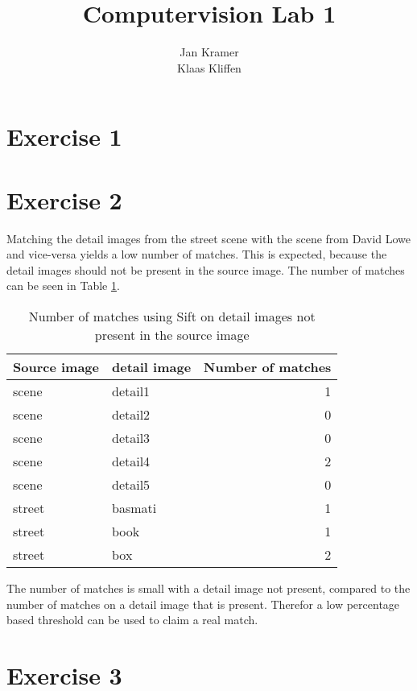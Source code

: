 \documentclass[11pt,a4paper]{article}
\author{Jan Kramer\\Klaas Kliffen}
\title{Computervision Lab 1}
\begin{document}
\maketitle

\section*{Exercise 1}

\section*{Exercise 2}
Matching the detail images from the street scene with the scene from David Lowe and vice-versa yields a low number of matches.
This is expected, because the detail images should not be present in the source image. The number of matches can be seen in Table \ref{tab:mismatches}.
\begin{table}[H]
\centering
\begin{tabular}{l|l|r}
Source image & detail image & Number of matches\\
\hline
scene & detail1 & 1\\
scene & detail2 & 0\\
scene & detail3 & 0\\
scene & detail4 & 2\\
scene & detail5 & 0\\
street & basmati & 1\\
street & book & 1\\
street & box & 2
\end{tabular}
\caption{Number of matches using Sift on detail images not present in the source image}
\label{tab:mismatches}
\end{table}
\noindent The number of matches is small with a detail image not present, compared to the number of matches on a detail image that is present. Therefor a low percentage based threshold can be used to claim a real match. 

\section*{Exercise 3}
\end{document}
